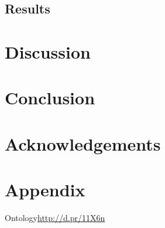 \documentclass{sigchi}
\begin{document}
\subsection{Results}

\section{Discussion}

\section{Conclusion}

\section{Acknowledgements}

\balance



\section{Appendix}
Ontology\url{http://d.pr/11X6n}
\end{document}
